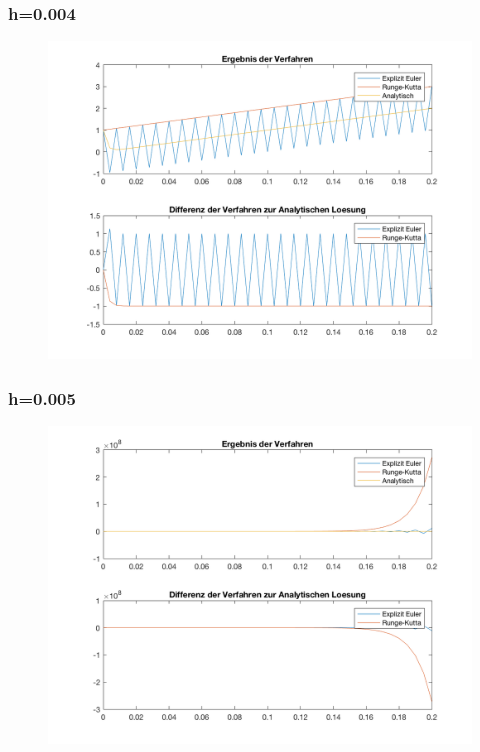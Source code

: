 \documentclass[]{scrartcl}
\begin{document}
\subsubsection{h=0.004}
\begin{figure}[htbp]
	\centering
	\includegraphics[width=1\linewidth]{a1_1_3}
	\caption{}
	\label{fig:a1_1_3}
\end{figure}

\subsubsection{h=0.005}
\begin{figure}[htbp]
	\centering
	\includegraphics[width=1\linewidth]{a1_1_4}
	\caption{}
	\label{fig:a1_1_4}
\end{figure}
\end{document}
